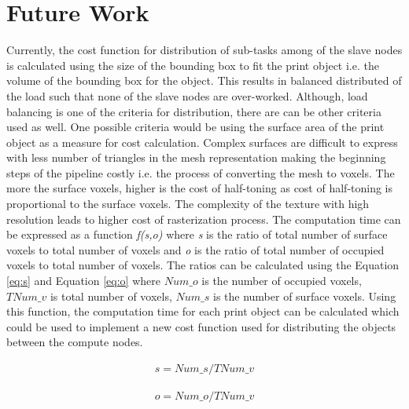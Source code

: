 \newpage   
\chapter{Future Work}

Currently, the cost function for distribution of sub-tasks among of the slave nodes is calculated using the size of the bounding box to fit the print object i.e. the volume of the bounding box for the object. This results in balanced distributed of the load such that none of the slave nodes are over-worked. Although, load balancing is one of the criteria for distribution, there are can be other criteria used as well. One possible criteria would be using the surface area of the print object as a measure for cost calculation. Complex surfaces are difficult to express with less number of triangles in the mesh representation making the beginning steps of the pipeline costly i.e. the process of converting the mesh to voxels. The more the surface voxels, higher is the cost of half-toning as cost of half-toning is proportional to the surface voxels. The complexity of the texture with high resolution leads to higher cost of rasterization process. The computation time can be expressed as a function \textit{f(s,o)} where \textit{s} is the ratio of total number of surface voxels to total number of voxels and \textit{o} is the ratio of total number of occupied voxels to total number of voxels. The ratios can be calculated using the Equation \ref{eq:s} and Equation \ref{eq:o} where \begin{math}Num\_{o} \end{math} is the number of occupied voxels, \begin{math} TNum\_{v} \end{math} is total number of voxels, \begin{math}Num\_{s} \end{math} is the number of surface voxels. Using this function, the computation time for each print object can be calculated which could be used to implement a new cost function used for distributing the objects between the compute nodes.  

\begin{equation}
\label{eq:s}
\begin{aligned}
s= Num\_{s} / TNum\_{v}
\end{aligned}
\end{equation}   

\begin{equation}
\label{eq:o}
\begin{aligned}
o=  Num\_{o} / TNum\_{v}
\end{aligned}
\end{equation}   

